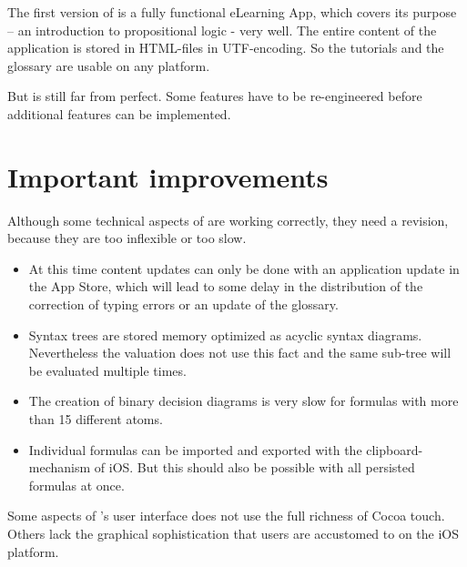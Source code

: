 
The first version of \Nyaya is a fully functional eLearning App, 
which covers its purpose – an introduction to propositional logic - very well.
The entire content of the application is stored in HTML-files in UTF-encoding.
So the tutorials and the glossary are usable on any platform.

But \Nyaya is still far from perfect.
Some features have to be re-engineered before additional features can be implemented.



\section{Important improvements}

Although some technical aspects of \Nyaya are working correctly, they need a revision, 
because they are too inflexible or too slow.

\begin{itemize}

\item At this time content updates can only be done with an application update in the App Store,
which will lead to some delay in the distribution of the correction of typing errors or an update of the glossary.

\item Syntax trees are stored memory optimized as acyclic syntax diagrams. 
Nevertheless the valuation does not use this fact and the same sub-tree will be evaluated multiple times.

\item The creation of binary decision diagrams is very slow for formulas with more than 15 different atoms.

\item Individual formulas can be imported and exported with the clipboard-mechanism of iOS. 
But this should also be possible with all persisted formulas at once. 


\end{itemize}

Some aspects of \Nyaya’s user interface does not use the full richness of Cocoa touch. 
Others lack the graphical sophistication that users are accustomed to on the iOS platform.


